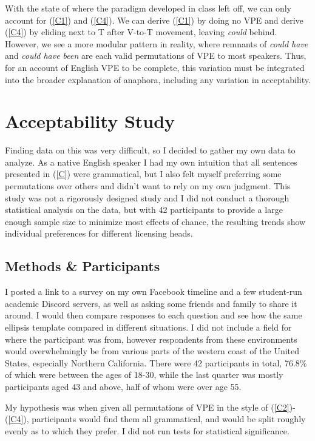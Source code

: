 \documentclass[11pt, oneside]{article}
\begin{document}
With the state of where the paradigm developed in class left off, we can only account for (\ref{C1}) and (\ref{C4}). We can derive (\ref{C1}) by doing no VPE and derive (\ref{C4}) by eliding next to T after V-to-T movement, leaving \textit{could} behind. However, we see a more modular pattern in reality, where remnants of \textit{could have} and \textit{could have been} are each valid permutations of VPE to most speakers. Thus, for an account of English VPE to be complete, this variation must be integrated into the broader explanation of anaphora, including any variation in acceptability. 


\section{Acceptability Study}\label{Accs}

Finding data on this was very difficult, so I decided to gather my own data to analyze. As a native English speaker I had my own intuition that all sentences presented in (\ref{C}) were grammatical, but I also felt myself preferring some permutations over others and didn't want to rely on my own judgment. This study was not a rigorously designed study and I did not conduct a thorough statistical analysis on the data, but with 42 participants to provide a large enough sample size to minimize most effects of chance, the resulting trends show individual preferences for different licensing heads.

\subsection{Methods \& Participants}

I posted a link to a survey on my own Facebook timeline and a few student-run academic Discord servers, as well as asking some friends and family to share it around. I would then compare responses to each question and see how the same ellipsis template compared in different situations. I did not include a field for where the participant was from, however respondents from these environments would overwhelmingly be from various parts of the western coast of the United States, especially Northern California. There were 42 participants in total, 76.8\% of which were between the ages of 18-30, while the last quarter was mostly participants aged 43 and above, half of whom were over age 55.

My hypothesis was when given all permutations of VPE in the style of (\ref{C2})-(\ref{C4}), participants would find them all grammatical, and would be split roughly evenly as to which they prefer. I did not run tests for statistical significance.
\end{document}
